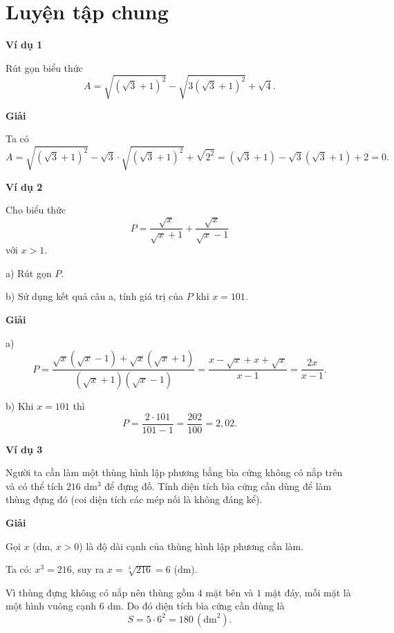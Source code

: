 
\section*{Luyện tập chung}

\begin{lesson}
    \textbf{Ví dụ 1}

    Rút gọn biểu thức
    \[
        A=\sqrt{(\sqrt{3}+1)^2}-\sqrt{3(\sqrt{3}+1)^2}+\sqrt{4}.
    \]

    \textbf{Giải}

    Ta có
    \[
        A=\sqrt{(\sqrt{3}+1)^2}-\sqrt{3}\cdot\sqrt{(\sqrt{3}+1)^2}+\sqrt{2^2}
        =(\sqrt{3}+1)-\sqrt{3}(\sqrt{3}+1)+2=0.
    \]

    \textbf{Ví dụ 2}

    Cho biểu thức
    \[
        P=\dfrac{\sqrt{x}}{\sqrt{x}+1}+\dfrac{\sqrt{x}}{\sqrt{x}-1}
    \]
    với $x>1$.

    a) Rút gọn $P$.

    b) Sử dụng kết quả câu a, tính giá trị của $P$ khi $x=101$.

    \textbf{Giải}

    a)
    \[
        P=\dfrac{\sqrt{x}(\sqrt{x}-1)+\sqrt{x}(\sqrt{x}+1)}{(\sqrt{x}+1)(\sqrt{x}-1)}
        =\dfrac{x-\sqrt{x}+x+\sqrt{x}}{x-1}
        =\dfrac{2x}{x-1}.
    \]

    b) Khi $x=101$ thì
    \[
        P=\dfrac{2\cdot101}{101-1}=\dfrac{202}{100}=2,02.
    \]

    \textbf{Ví dụ 3}

    Người ta cần làm một thùng hình lập phương bằng bìa cứng không có nắp trên và có thể tích $216$ dm$^3$ để đựng đồ. Tính diện tích bìa cứng cần dùng để làm thùng đựng đó (coi diện tích các mép nối là không đáng kể).


    \textbf{Giải}

    Gọi $x$ (dm, $x>0$) là độ dài cạnh của thùng hình lập phương cần làm.

    Ta có: $x^3=216$, suy ra $x=\sqrt[3]{216}=6$ (dm).

    Vì thùng đựng không có nắp nên thùng gồm $4$ mặt bên và $1$ mặt đáy, mỗi mặt là một hình vuông cạnh $6$ dm. Do đó diện tích bìa cứng cần dùng là
    \[
        S=5\cdot6^2=180\,(\text{dm}^2).
    \]
\end{lesson}

